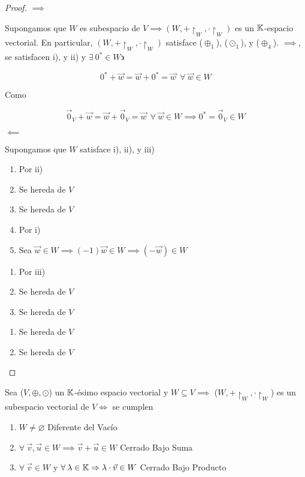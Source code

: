 \begin{proof}
    $\implies$

    Supongamos que $W$ es subespacio de $V \implies (W,+ \restriction_W,\cdot  {\restriction}_{W})$ es un $\mathbb{K}$-espacio vectorial. En particular, $(W,+ \restriction_W,\cdot  {\restriction}_{W})$ satisface ($\oplus_1$), (${\odot}_{1}$), y ($\oplus_4$). $\implies$, se satisfacen i), y ii) y $\exists \: {0}^{*} \in W \backepsilon$
    
    $$ {0}^{*} + \vec{w} =\vec{w}  +  {0}^{*} = \vec{w} \: \: \forall \: \vec{w}  \in W$$
    
    Como 
    
    $$ {\vec{0}}_{V} + \vec{w} =\vec{w}  +  {\vec{0}}_{V}  = \vec{w} \: \: \forall \: \vec{w}  \in W \implies {0}^{*}={\vec{0}}_{V} \in W $$

    $\impliedby$

    Supongamos que $W$ satisface i), ii), y iii)
    
    \begin{enumerate}[label=(\subscript{\oplus}{{\arabic*}})]
    \item Por ii)
    \item Se hereda de $V$
    \item Se hereda de $V$
    \item Por i)
    \item Sea $\vec{w} \in W \implies (-1)\vec{w} \in W 
    \implies (-\vec{w}) \in W$
    \end{enumerate}
    \begin{enumerate}[label=(\subscript{\odot}{{\arabic*}})]
    \item Por iii)
    \item Se hereda de $V$
    \item Se hereda de $V$
    \end{enumerate}
    \begin{enumerate}[label=(\subscript{D}{{\arabic*}})]
    \item Se hereda de $V$
    \item Se hereda de $V$
    \end{enumerate}
\end{proof}

\begin{theorem} \label{teo4}
    Sea ($V, \oplus, \odot$) un $\mathbb{K}$-ésimo espacio vectorial y $W \subseteq V \implies$  ($W,+ \restriction_W,\cdot  {\restriction}_{W}$) es un subespacio vectorial de $V \iff$ se cumplen

    \begin{enumerate}[label={\roman*})]
        \item $W \neq \varnothing$ \hfill \textcolor{red!70!black}{Diferente del Vacío}
        \item $\forall \: \vec{v}, \vec{u} \in W \implies \vec{v} + \vec{u} \in W $ \hfill \textcolor{red!70!black}{Cerrado Bajo Suma}
        \item $\forall \: \vec{v} \in W $ y $\forall \: \lambda \in \mathbb{K} \Rightarrow \lambda \cdot \vec{v} \in W$ \hfill \textcolor{red!70!black}{Cerrado Bajo Producto}
    \end{enumerate}
\end{theorem}

